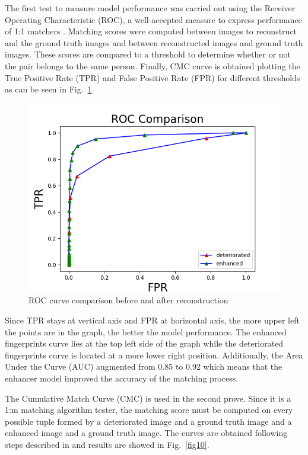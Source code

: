 \documentclass[a4paper,fleqn]{cas-dc}
\begin{document}
The first test to measure model performance was carried out using the Receiver Operating Characteristic (ROC), a well-accepted measure to express performance of 1:1 matchers \cite{RROCCMC}. Matching scores were computed between images to reconstruct and the ground truth images and between reconstructed images and ground truth images. These scores are compared to a threshold to determine whether or not the pair belongs to the same person. Finally, CMC curve is obtained plotting the True Positive Rate (TPR) and False Positive Rate (FPR) for different thresholds as can be seen in Fig.~\ref{fig9}.

\begin{figure}[htbp]
\centerline{\includegraphics[scale=0.5]{figs/roc_comparison.png}}
\caption{ROC curve comparison before and after reconstruction}
\label{fig9}
\end{figure}

Since TPR stays at vertical axis and FPR at horizontal axis, the more upper left the points are in the graph, the better the model performance. The enhanced fingerprints curve lies at the top left side of the graph while the deteriorated fingerprints curve is located at a more lower right position. Additionally, the Area Under the Curve (AUC) augmented from 0.85 to 0.92 which means that the enhancer model improved the accuracy of the matching process.

The Cumulative Match Curve (CMC) is used in the second prove. Since it is a 1:m matching algorithm tester, the matching score must be computed on every possible tuple formed by a deteriorated image and a ground truth image and a enhanced image and a ground truth image. The curves are obtained following steps described in \cite{RROCCMC} and results are showed in Fig.~\ref{fig10}.
\end{document}
